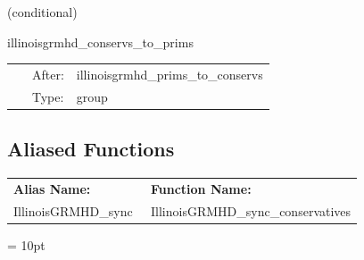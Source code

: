 \vspace{5mm}

   (conditional) 

\hspace{5mm} illinoisgrmhd\_conservs\_to\_prims 

\hspace{5mm}{\it compute primitive variables from conservatives } 


\hspace{5mm}

 \begin{tabular*}{160mm}{cll} 
~ & After:  & illinoisgrmhd\_prims\_to\_conservs \\ 
~ & Type:  & group \\ 
\end{tabular*} 


\subsection*{Aliased Functions}

\hspace{5mm}

 \begin{tabular*}{160mm}{ll} 

{\bf Alias Name:} ~~~~~~~ & {\bf Function Name:} \\ 
IllinoisGRMHD\_sync & IllinoisGRMHD\_sync\_conservatives \\ 
\end{tabular*} 



\vspace{5mm}\parskip = 10pt 
